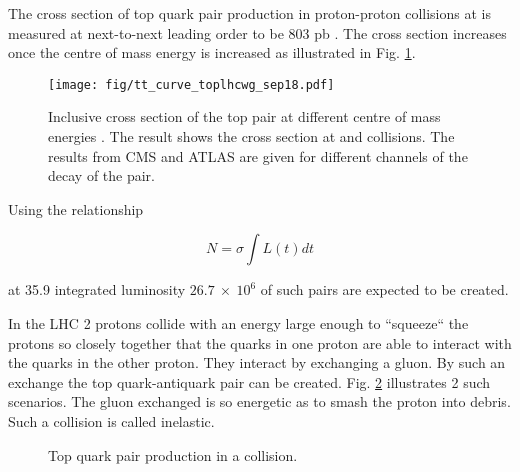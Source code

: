 The cross section of top quark pair production in proton-proton collisions at  \TeV is measured at next-to-next leading order to be 803 pb \cite{Sirunyan:2018goh}. The cross section increases once the centre of mass energy is increased as illustrated in Fig. \ref{fig:tt_curve_toplhcwg_sep18}.

\begin{figure}[hbtp]

  \centering
  \texttt{[image: fig/tt\_curve\_toplhcwg\_sep18.pdf]}
  \caption{Inclusive cross section of the top pair at different centre of mass energies \cite{twiki:tt_curve_toplhcwg_sep18}. The result shows the cross section at \Pp\Pp and \Pp\Pap collisions. The results from CMS and ATLAS are given for different channels of the decay of the \ttbar pair.}
  \label{fig:tt_curve_toplhcwg_sep18}
  
\end{figure}

Using the relationship

\begin{equation}
N=\sigma\int L(t)dt
\end{equation}

at 35.9 \fbinv integrated luminosity $26.7\ \times\ 10^{6}$ of such pairs are expected to be created. 

In the LHC 2 protons collide with an energy large enough to ``squeeze`` the protons so closely together that the quarks in one proton are able to interact with the quarks in the other proton. They interact by exchanging a gluon. By such an exchange the top quark-antiquark pair can be created. Fig. \ref{fig:top_quark_productions} illustrates 2 such scenarios. The gluon exchanged is so energetic as to smash the proton into debris. Such a collision is called inelastic.

\begin{figure}[h!]
  \centering
  \def\twidth{0.3}
  \hfil

  \caption{Top quark pair production in a \Pp\Pp collision.}
  \label{fig:top_quark_productions}
\end{figure}

